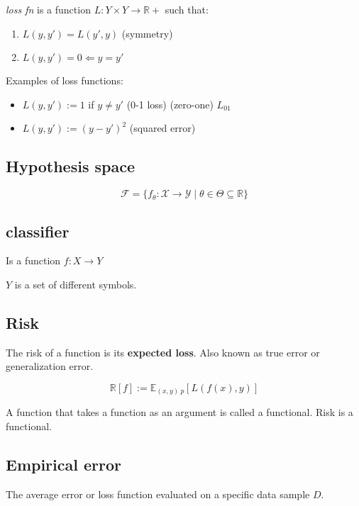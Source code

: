 \emph{loss fn} is a function
\(L: Y \times Y \longrightarrow \mathds{R}+\) such that:

\begin{enumerate}
	\item
	      \(L(y, y') = L(y', y)\) (symmetry)
	\item
	      \(L(y, y') = 0  \Longleftarrow y = y'\)
\end{enumerate}

Examples of loss functions:

\begin{itemize}
	\item
	      \(L(y, y') := 1\) if \(y \neq y'\) (0-1 loss) (zero-one) \(L_{01}\)
	\item
	      \(L(y, y') := (y - y')^2\) (squared error)
\end{itemize}

\subsection{Hypothesis space}

\[
	\mathcal{F} = \{f_\theta: \mathcal{X} \rightarrow \mathcal{Y} \mid \theta \in \varTheta \subseteq \mathds{R} \}
\]

\subsection{classifier}

Is a function \(f: X \longrightarrow Y\)

\(Y\) is a set of different symbols.

\subsection{Risk}

The risk of a function is its \textbf{expected loss}. Also known as true
error or generalization error.

\[\mathds{R}[f] := \mathds{E}_{(x, y) ~ p} [ L(f(x), y) ]
\]

A function that takes a function as an argument is called a functional.
Risk is a functional.

\subsection{Empirical error}

The average error or loss function evaluated on a specific data sample
\(D\).

